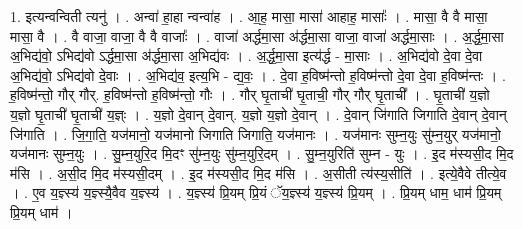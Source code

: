 \documentclass[17pt]{extarticle}
\begin{document}
1. इत्यन्वन्विती त्यनु॑ । . अन्वा॑ हा॒हा न्वन्वा॑ह । . आ॒ह॒ मासा॒ मासा॑ आहाह॒ मासाः᳚ । . मासा॒ वै वै मासा॒ मासा॒ वै । . वै वाजा॒ वाजा॒ वै वै वाजाः᳚ । . वाजा॑ अर्द्धमा॒सा अ॑र्द्धमा॒सा वाजा॒ वाजा॑ अर्द्धमा॒साः । . अ॒र्द्ध॒मा॒सा अ॒भिद्य॑वो॒ ऽभिद्य॑वो ऽर्द्धमा॒सा अ॑र्द्धमा॒सा अ॒भिद्य॑वः । . अ॒र्द्ध॒मा॒सा इत्य॑र्द्ध - मा॒साः । . अ॒भिद्य॑वो दे॒वा दे॒वा अ॒भिद्य॑वो॒ ऽभिद्य॑वो दे॒वाः । . अ॒भिद्य॑व॒ इत्य॒भि - द्य॒वः॒ । . दे॒वा ह॒विष्म॑न्तो ह॒विष्म॑न्तो दे॒वा दे॒वा ह॒विष्म॑न्तः । . ह॒विष्म॑न्तो॒ गौर् गौर्. ह॒विष्म॑न्तो ह॒विष्म॑न्तो॒ गौः । . गौर् घृ॒ताची॑ घृ॒ताची॒ गौर् गौर् घृ॒ताची᳚ । . घृ॒ताची॑ य॒ज्ञो य॒ज्ञो घृ॒ताची॑ घृ॒ताची॑ य॒ज्ञ्ः । . य॒ज्ञो दे॒वान् दे॒वान्. य॒ज्ञो य॒ज्ञो दे॒वान् । . दे॒वान् जि॑गाति जिगाति दे॒वान् दे॒वान् जि॑गाति । . जि॒गा॒ति॒ यज॑मानो॒ यज॑मानो जिगाति जिगाति॒ यज॑मानः । . यज॑मानः सुम्न॒युः सु॑म्न॒युर् यज॑मानो॒ यज॑मानः सुम्न॒युः । . सु॒म्न॒युरि॒द मि॒दꣳ सु॑म्न॒युः सु॑म्न॒युरि॒दम् । . सु॒म्न॒युरिति॑ सुम्न - युः । . इ॒द म॑स्यसी॒द मि॒द म॑सि । . अ॒सी॒द मि॒द म॑स्यसी॒दम् । . इ॒द म॑स्यसी॒द मि॒द म॑सि । . अ॒सीती त्य॑स्य॒सीति॑ । . इत्ये॒वैवे तीत्ये॒व । . ए॒व य॒ज्ञ्स्य॑ य॒ज्ञ्स्यै॒वैव य॒ज्ञ्स्य॑ । . य॒ज्ञ्स्य॑ प्रि॒यम् प्रि॒यं ॅय॒ज्ञ्स्य॑ य॒ज्ञ्स्य॑ प्रि॒यम् । . प्रि॒यम् धाम॒ धाम॑ प्रि॒यम् प्रि॒यम् धाम॑ । \newline
\end{document}
